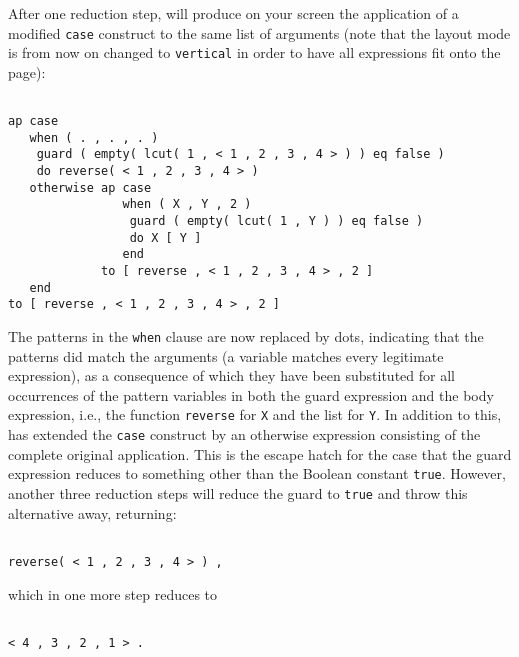 After one reduction step, \pired  will produce on your screen the application of a 
modified {\tt case} construct to the same list of arguments (note that the layout mode is
from now on changed to {\tt vertical} in order to have all expressions fit onto the page):
\begin{verbatim}

ap case 
   when ( . , . , . )
    guard ( empty( lcut( 1 , < 1 , 2 , 3 , 4 > ) ) eq false )
    do reverse( < 1 , 2 , 3 , 4 > )
   otherwise ap case 
                when ( X , Y , 2 )
                 guard ( empty( lcut( 1 , Y ) ) eq false )
                 do X [ Y ]
                end
             to [ reverse , < 1 , 2 , 3 , 4 > , 2 ]
   end
to [ reverse , < 1 , 2 , 3 , 4 > , 2 ]

\end{verbatim}
The patterns in the {\tt when} clause are now replaced by dots, indicating that the patterns
did match the arguments (a variable matches every legitimate \kir expression), as a consequence
of which they have been substituted for all occurrences of the pattern variables in both
the guard expression and the body expression, i.e., the function {\tt reverse} for {\tt X}
and the list {\tt <1,2,3,4>} for {\tt Y}. In addition to this, \pired has extended the {\tt case} 
construct by  an {\mys otherwise expression} consisting of the complete original application.
This is the {\mys escape hatch} for the case that the guard expression reduces to something
other than the Boolean constant {\tt true}. However, another three reduction steps will reduce the
guard to {\tt true} and throw this alternative away, returning:
\begin{verbatim}

reverse( < 1 , 2 , 3 , 4 > ) ,

\end{verbatim}
which in one more step reduces to
\begin{verbatim}

< 4 , 3 , 2 , 1 > .

\end{verbatim}
